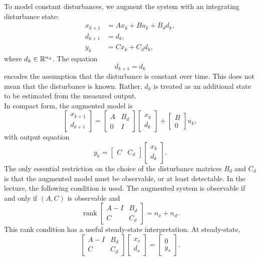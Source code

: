 To model constant disturbances, we augment the system with an integrating disturbance state:
\[
\begin{aligned}
    x_{k+1} &= Ax_k + Bu_k + B_d d_k,\\
    d_{k+1} &= d_k,\\
    y_k &= Cx_k + C_d d_k,
\end{aligned}
\]
where \(d_k\in\mathbb{R}^{n_d}\). The equation
\[
    d_{k+1}=d_k
\]
encodes the assumption that the disturbance is constant over time. This does not mean that the
disturbance is known. Rather, \(d_k\) is treated as an additional state to be estimated from the
measured output.\\
In compact form, the augmented model is
\[
    \begin{bmatrix}
        x_{k+1}\\ d_{k+1}
    \end{bmatrix}
    =
    \begin{bmatrix}
        A & B_d\\
        0 & I
    \end{bmatrix}
    \begin{bmatrix}
        x_k\\ d_k
    \end{bmatrix}
    +
    \begin{bmatrix}
        B\\ 0
    \end{bmatrix}
    u_k,
\]
with output equation
\[
    y_k =
    \begin{bmatrix}
        C & C_d
    \end{bmatrix}
    \begin{bmatrix}
        x_k\\ d_k
    \end{bmatrix}.
\]
The only essential restriction on the choice of the disturbance matrices \(B_d\) and \(C_d\) is
that the augmented model must be observable, or at least detectable. In the lecture, the
following condition is used. The augmented system is observable if and only if \((A,C)\) is
observable and
\[
    \operatorname{rank}
    \begin{bmatrix}
        A-I & B_d\\
        C   & C_d
    \end{bmatrix}
    =
    n_x+n_d.
\]
This rank condition has a useful steady-state interpretation. At steady-state,
\[
    \begin{bmatrix}
        A-I & B_d\\
        C   & C_d
    \end{bmatrix}
    \begin{bmatrix}
        x_s\\ d_s
    \end{bmatrix}
    =
    \begin{bmatrix}
        0\\ y_s
    \end{bmatrix}.
\]
